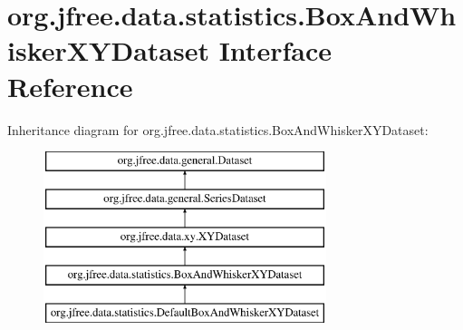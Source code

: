 \hypertarget{interfaceorg_1_1jfree_1_1data_1_1statistics_1_1_box_and_whisker_x_y_dataset}{}\section{org.\+jfree.\+data.\+statistics.\+Box\+And\+Whisker\+X\+Y\+Dataset Interface Reference}
\label{interfaceorg_1_1jfree_1_1data_1_1statistics_1_1_box_and_whisker_x_y_dataset}
Inheritance diagram for org.\+jfree.\+data.\+statistics.\+Box\+And\+Whisker\+X\+Y\+Dataset\+:\begin{figure}[H]
\begin{center}
\leavevmode
\includegraphics[height=5.000000cm]{interfaceorg_1_1jfree_1_1data_1_1statistics_1_1_box_and_whisker_x_y_dataset}
\end{center}
\end{figure}
